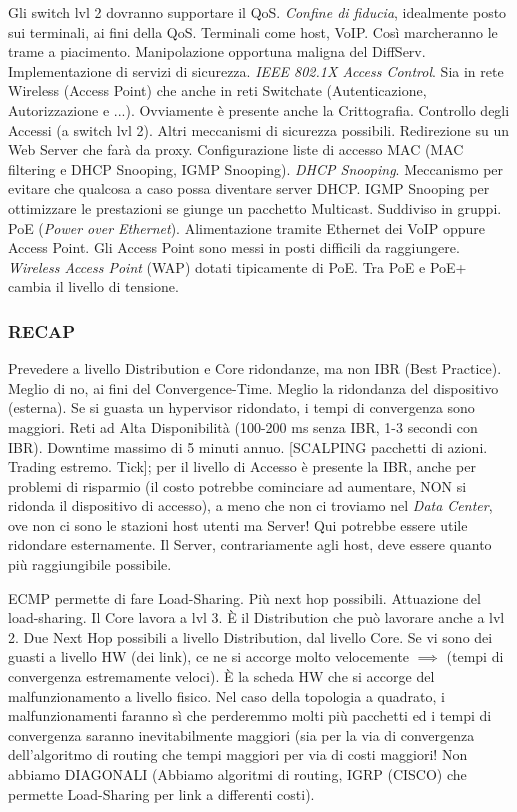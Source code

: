 Gli switch lvl 2 dovranno supportare il QoS. \textit{Confine di fiducia}, idealmente posto sui terminali, ai fini della QoS. Terminali come host, VoIP. Così marcheranno le trame a piacimento. Manipolazione opportuna maligna del DiffServ. Implementazione di servizi di sicurezza. \textit{IEEE 802.1X Access Control}. Sia in rete Wireless (Access Point) che anche in reti Switchate (Autenticazione, Autorizzazione e ...). Ovviamente è presente anche la Crittografia. Controllo degli Accessi (a switch lvl 2). Altri meccanismi di sicurezza possibili. Redirezione su un Web Server che farà da proxy. Configurazione liste di accesso MAC (MAC filtering e DHCP Snooping, IGMP Snooping). \textit{DHCP Snooping}. Meccanismo per evitare che qualcosa a caso possa diventare server DHCP. IGMP Snooping per ottimizzare le prestazioni se giunge un pacchetto Multicast. Suddiviso in gruppi. PoE (\textit{Power over Ethernet}). Alimentazione tramite Ethernet dei VoIP oppure Access Point. Gli Access Point sono messi in posti difficili da raggiungere. \textit{Wireless Access Point} (WAP) dotati tipicamente di PoE. Tra PoE e PoE+ cambia il livello di tensione.

\subsubsection{RECAP}

Prevedere a livello Distribution e Core ridondanze, ma non IBR (Best Practice). Meglio di no, ai fini del Convergence-Time. Meglio la ridondanza del dispositivo (esterna). Se si guasta un hypervisor ridondato, i tempi di convergenza sono maggiori. Reti ad Alta Disponibilità (100-200 ms senza IBR, 1-3 secondi con IBR). Downtime massimo di 5 minuti annuo. [SCALPING pacchetti di azioni. Trading estremo. Tick]; per il livello di Accesso è presente la IBR, anche per problemi di risparmio (il costo potrebbe cominciare ad aumentare, NON si ridonda il dispositivo di accesso), a meno che non ci troviamo nel \textit{Data Center}, ove non ci sono le stazioni host utenti ma Server! Qui potrebbe essere utile ridondare esternamente. Il Server, contrariamente agli host, deve essere quanto più raggiungibile possibile.

ECMP permette di fare Load-Sharing. Più next hop possibili. Attuazione del load-sharing. Il Core lavora a lvl 3. \`E il Distribution che può lavorare anche a lvl 2. Due Next Hop possibili a livello Distribution, dal livello Core. Se vi sono dei guasti a livello HW (dei link), ce ne si accorge molto velocemente $\implies$ (tempi di convergenza estremamente veloci). \`E la scheda HW che si accorge del malfunzionamento a livello fisico. Nel caso della topologia a quadrato, i malfunzionamenti faranno sì che perderemmo molti più pacchetti ed i tempi di convergenza saranno inevitabilmente maggiori (sia per la via di convergenza dell'algoritmo di routing che tempi maggiori per via di costi maggiori! Non abbiamo DIAGONALI (Abbiamo algoritmi di routing, IGRP (CISCO) che permette Load-Sharing per link a differenti costi).

